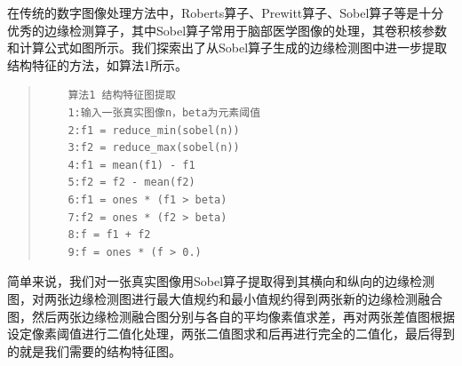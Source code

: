 \documentclass[letterpaper]{article} %
\begin{document}
在传统的数字图像处理方法中，Roberts算子、Prewitt算子、Sobel算子等是十分优秀的边缘检测算子，其中Sobel算子常用于脑部医学图像的处理，其卷积核参数和计算公式如图所示。我们探索出了从Sobel算子生成的边缘检测图中进一步提取结构特征的方法，如算法1所示。
\begin{quote}
	\begin{scriptsize}\begin{verbatim}
	算法1 结构特征图提取
	1:输入一张真实图像n，beta为元素阈值
	2:f1 = reduce_min(sobel(n))
	3:f2 = reduce_max(sobel(n))
	4:f1 = mean(f1) - f1
	5:f2 = f2 - mean(f2)
	6:f1 = ones * (f1 > beta)
	7:f2 = ones * (f2 > beta)
	8:f = f1 + f2
	9:f = ones * (f > 0.)
	\end{verbatim}\end{scriptsize}
\end{quote}
简单来说，我们对一张真实图像用Sobel算子提取得到其横向和纵向的边缘检测图，对两张边缘检测图进行最大值规约和最小值规约得到两张新的边缘检测融合图，然后两张边缘检测融合图分别与各自的平均像素值求差，再对两张差值图根据设定像素阈值进行二值化处理，两张二值图求和后再进行完全的二值化，最后得到的就是我们需要的结构特征图。
\end{document}
